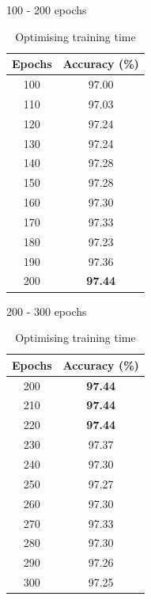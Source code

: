 \documentclass[12pt]{article}
\begin{document}
    \begin{table}[H]
      \begin{subtable}{.5\linewidth}
        \centering
        \caption{100 - 200 epochs}
        \begin{tabular}{c|c}
          \toprule
          Epochs & Accuracy (\%) \\
          \midrule
          100   & 97.00 \\
          110   & 97.03 \\
          120   & 97.24 \\
          130   & 97.24 \\
          140   & 97.28 \\
          150   & 97.28 \\
          160   & 97.30 \\
          170   & 97.33 \\
          180   & 97.23 \\
          190   & 97.36 \\
          200   & \textbf{97.44} \\
          \bottomrule
        \end{tabular}%
        \label{tab:mlp-tt-1}%
      \end{subtable}
      \begin{subtable}{.5\linewidth}
        \centering
        \caption{200 - 300 epochs}
        \begin{tabular}{c|c}
          \toprule
          Epochs & Accuracy (\%) \\
          \midrule
          200   & \textbf{97.44} \\
          210   & \textbf{97.44} \\
          220   & \textbf{97.44} \\
          230   & 97.37 \\
          240   & 97.30 \\
          250   & 97.27 \\
          260   & 97.30 \\
          270   & 97.33 \\
          280   & 97.30 \\
          290   & 97.26 \\
          300   & 97.25 \\
          \bottomrule
        \end{tabular}%
        \label{tab:mlp-tt-2}%
      \end{subtable}
      \caption{Optimising training time}
      \label{tab:mlp-tt}
    \end{table}%
\end{document}
